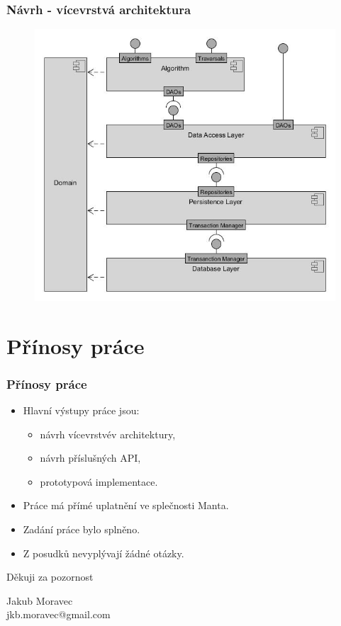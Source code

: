 \documentclass{beamer}
\begin{document}
\begin{frame}
\frametitle{Návrh - vícevrstvá architektura}
   \begin{figure}
   \includegraphics[width=0.7\linewidth]{img/connector_modules}
   \end{figure}
\end{frame}

\section{Přínosy práce}
\begin{frame}
\frametitle{Přínosy práce}
\begin{itemize}
\item Hlavní výstupy práce jsou:
   \begin{itemize}
      \item návrh vícevrstvév architektury,
      \item návrh příslušných API,
      \item prototypová implementace.
   \end{itemize}
\item Práce má přímé uplatnění ve splečnosti Manta.
\item Zadání práce bylo splněno.
\item Z posudků nevyplývají žádné otázky.
\end{itemize}
\end{frame}
\begin{frame}
   \centering\Large Děkuji za pozornost
   \vspace{2em}

   \centering\normalsize
   Jakub Moravec\\ jkb.moravec@gmail.com
\end{frame}
\end{document}
